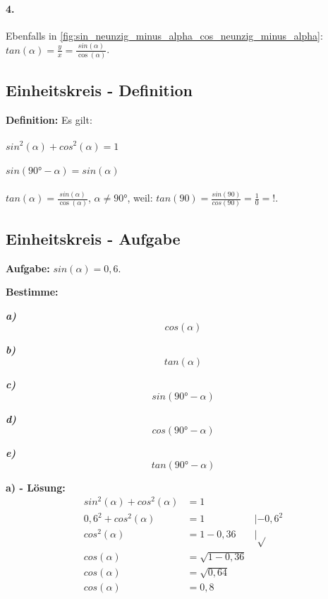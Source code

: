 \documentclass[12pt,a4paper]{article}
\begin{document}
\paragraph{4.}
Ebenfalls in \autoref{fig:sin_neunzig_minus_alpha_cos_neunzig_minus_alpha}:\\
$tan(\alpha) = \frac{y}{x} = \frac{sin(\alpha)}{\cos(\alpha)}$.
\newpage
\subsection{Einheitskreis - Definition}
\textbf{Definition:} Es gilt:
\paragraph{}
$sin^2(\alpha) + cos^2(\alpha) = 1$
\paragraph{}
$sin(90° - \alpha) = sin(\alpha)$
\paragraph{}
$tan(\alpha) = \frac{sin(\alpha)}{\cos(\alpha)}$, $\alpha \neq 90°$, weil: 
$tan(90)=\frac{sin(90)}{cos(90)} = \frac{1}{0} = !$.
\subsection{Einheitskreis - Aufgabe}
\textbf{Aufgabe:}
$sin(\alpha) = 0,6$. \\
{\footnotesize
\textbf{Bestimme:}
\begin{multicols}{5}
\textit{\textbf{a)}}
\[
    cos(\alpha)
\]

\textit{\textbf{b)}}
\[
    tan(\alpha)
\]

\textit{\textbf{c)}}
\[
    sin(90° - \alpha)
\]

\textit{\textbf{d)}}
\[
    cos(90° - \alpha)
\]

\textit{\textbf{e)}}
\[
    tan(90° - \alpha)
\]
\end{multicols}
}
\textbf{a) - Lösung:}
\begin{align}
	sin^2(\alpha) + cos^2(\alpha) &= 1 \tag{1} \\
	0,6^2 + cos^2(\alpha) &= 1 &|-0,6^2 \tag{2} \\
	cos^2(\alpha) &= 1 - 0,36 &|\sqrt{} \tag{3} \\
	cos(\alpha) &= \sqrt{1 - 0,36}   \tag{4} \\
	cos(\alpha) &= \sqrt{0,64}   \tag{5} \\
	cos(\alpha) &= 0,8   \tag{6}
\end{align}
\end{document}
